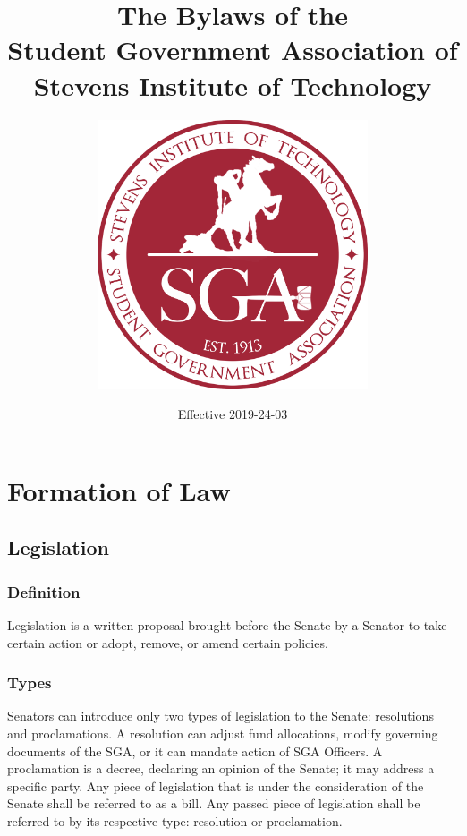 \documentclass[12pt]{scrreprt}
\begin{document}
\title{The Bylaws of the \\ Student Government Association of \\ Stevens Institute of Technology}
\subtitle{
    \vspace{1cm}
    \includegraphics[width=0.6\textwidth]{logo}
}
\date{Effective 2019-24-03}
\maketitle

\tableofcontents

\modulolinenumbers[1]
\linenumbers

\chapter{Formation of Law}

\section{Legislation}

\subsection{Definition}
Legislation is a written proposal brought before the Senate by a Senator to take certain action or adopt, remove, or amend certain policies.

\subsection{Types}
Senators can introduce only two types of legislation to the Senate: resolutions and proclamations. A resolution can adjust fund allocations, modify governing documents of the SGA, or it can mandate action of SGA Officers. A proclamation is a decree, declaring an opinion of the Senate; it may address a specific party. Any piece of legislation that is under the consideration of the Senate shall be referred to as a bill. Any passed piece of legislation shall be referred to by its respective type: resolution or proclamation.
\end{document}

